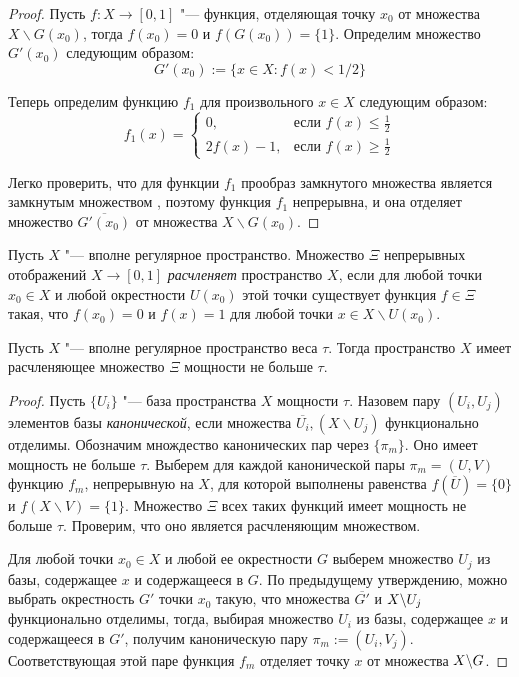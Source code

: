 \begin{proof}
    Пусть $f : X \to [0, 1]$ "--- функция, отделяющая точку $x_0$ от множества $X \backslash G(x_0)$, тогда $f(x_0) = 0$ и $f(G(x_0)) = \{1\}$. Определим множество $G'(x_0)$ следующим образом:
    \[G'(x_0) := \lbrace x \in X: f(x)<1/2\rbrace\]
    
    Теперь определим функцию $f_1$ для произвольного $x \in X$ следующим образом:
    \[
        f_1(x) =\begin{cases}
            0, & \text{если }f(x) \le \frac12\\
            2f(x) - 1, & \text{если }f(x) \ge \frac12
        \end{cases}
    \]
    
    Легко проверить, что для функции $f_1$ прообраз замкнутого множества является замкнутым множеством , поэтому функция $f_1$ непрерывна, и она отделяет множество $\overline{G'(x_0)}$ от множества $X\backslash G(x_0)$.
\end{proof}

\begin{definition}
    Пусть $X$ "--- вполне регулярное пространство. Множество $\Xi$ непрерывных отображений $X \rightarrow [0, 1]$ \textit{расчленяет} пространство $X$, если для любой точки $x_0 \in X$ и любой окрестности $U(x_0)$ этой точки существует функция $f \in \Xi$ такая, что $f(x_0) = 0$ и $f(x) = 1$ для любой точки $x \in X \backslash U(x_0)$.
\end{definition}

\begin{proposition}\label{thm2prop1}
    Пусть $X$ "--- вполне регулярное пространство веса $\tau$. Тогда пространство $X$ имеет расчленяющее множество $\Xi$ мощности не больше $\tau$.
\end{proposition}

\begin{proof}
    Пусть $\lbrace U_i\rbrace$ "--- база пространства $X$ мощности $\tau$. Назовем пару $(U_i, U_j)$ элементов базы \textit{канонической}, если множества $\overline{U_i}, (X \backslash U_j)$ функционально отделимы. Обозначим множдество канонических пар через $\{\pi_m\}$. Оно имеет мощность не больше $\tau$. Выберем для каждой канонической пары $\pi_m = (U, V)$ функцию $f_m$, непрерывную на $X$, для которой выполнены равенства $f(\overline{U}) = \{0\}$ и $f(X\backslash V) = \{1\}$. Множество $\Xi$ всех таких функций имеет мощность не больше $\tau$. Проверим, что оно является расчленяющим множеством.
    
    Для любой точки $x_0 \in X$ и любой ее окрестности $G$ выберем множество $U_j$ из базы, содержащее $x$ и содержащееся в $G$. По предыдущему утверждению, можно выбрать окрестность $G'$ точки $x_0$ такую, что множества $\overline{G'}$ и $X \backslash U_j$ функционально отделимы, тогда, выбирая множество $U_i$ из базы, содержащее $x$ и содержащееся в $G'$, получим каноническую пару $\pi_m := (U_i, V_j)$. Соответствующая этой паре функция $f_m$ отделяет точку $x$ от множества $X \backslash G$.
\end{proof}


